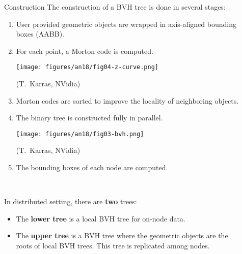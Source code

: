 \documentclass[final,hyperref={pdfpagelabels=false}]{beamer}
\begin{document}
\begin{frame}[t,fragile]
\begin{columns}[t]
\begin{column}{.450\textwidth}
\begin{block}{\centering Construction}
  The construction of a BVH tree is done in several stages:
  \begin{enumerate}
    \item User provided geometric objects are wrapped in axis-aligned bounding
      boxes (AABB).
    \item
      For each point, a Morton code is computed.

      \begin{center}
      \texttt{[image: figures/an18/fig04-z-curve.png]}

        {\small (T.~Karras, NVidia)}
      \end{center}
    \item
      Morton codes are sorted to improve the locality of neighboring objects.
    \item
      The binary tree is constructed fully in parallel.

      \begin{center}
      \texttt{[image: figures/an18/fig03-bvh.png]}

        {\small (T.~Karras, NVidia)}
      \end{center}
    \item The bounding boxes of each node are computed.
  \end{enumerate}

  \

  In distributed setting, there are \textbf{two} trees:
  \begin{itemize}
    \item
      The \textbf{lower tree} is a local BVH tree for on-node data.
    \item
      The \textbf{upper tree} is a BVH tree where the geometric objects are the
      roots of local BVH trees. This tree is replicated among nodes.
  \end{itemize}

\end{block}

\end{column} %

\begin{column}{.03\textwidth}\end{column}

\begin{column}{.480\textwidth}


\end{column}
\end{columns}
\end{frame}
\end{document}
